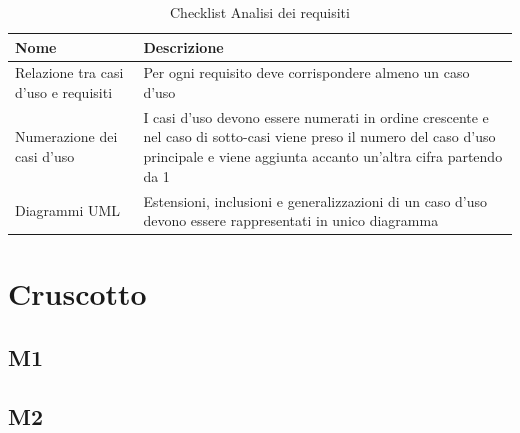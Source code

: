 \documentclass[a4paper,12pt]{article}
\begin{document}
                \begin{longtable}{|M{3.5cm}|M{8.5cm}|}
                    
                    \caption{Checklist Analisi dei requisiti} \\
                    \hline
                    \textbf{Nome} & \textbf{Descrizione} \\
                    \hline
                    \endhead

                    Relazione tra casi d’uso e requisiti & Per ogni requisito deve corrispondere almeno un caso d’uso \\
                    \hline

                    Numerazione dei casi d’uso & I casi d’uso devono essere numerati in ordine crescente e nel caso di sotto-casi viene preso il numero del caso d’uso principale e viene aggiunta accanto un’altra cifra partendo da 1 \\
                    \hline

                    Diagrammi UML & Estensioni, inclusioni e generalizzazioni di un caso d’uso devono essere rappresentati in unico diagramma \\
                    \hline

                \end{longtable}
        


    \section{Cruscotto}
        \subsection{M1}

        \subsection{M2}
\end{document}
